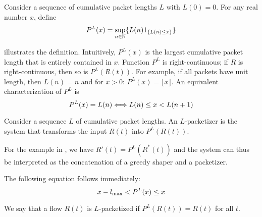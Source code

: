 \begin{definition}
Consider a sequence of cumulative packet lengths $L$ with
$L(0)=0$. For any real number $x$, define
\begin{equation}\mylabel{eq-vlp21}
P^L(x)= \sup_{n \in \Nats} \{ L(n) 1_{\{L(n) \leq  x\}}
 \}
\end{equation}%
 
\end{definition}
\begin{figure}[htbp]
\end{figure}
 illustrates the definition. Intuitively, $P^L(x)$ is
the largest cumulative packet length that is entirely contained in
$x$. Function $P^L$ is right-continuous; if $R$ is
right-continuous, then so is $P^L(R(t))$. For example, if all
packets have unit length, then $L(n)=n$ and for $x>0$:
$P^L(x)=\lfloor x \rfloor$. An equivalent characterization of
$P^L$ is
\begin{equation}\mylabel{eq-pl1}
  P^L(x) = L(n) \Longleftrightarrow L(n) \leq x < L(n+1)
\end{equation}

\begin{definition}
Consider a sequence $L$ of cumulative packet lengths. An
$L$-packetizer is the system that
transforms the input $R(t)$ into $P^L(R(t))$.%
\end{definition}

For the example in , we have $R'(t)=P^L(R^*(t))$
and the system can thus be interpreted as the concatenation of a
greedy shaper and a packetizer.

The following equation follows immediately:
\begin{equation}\mylabel{eq-plmax}
   x - l_{\max} < P^L(x) \leq x
\end{equation}
\begin{definition}
We say that a flow $R(t)$ is $L$-packetized if $P^L(R(t))=R(t)$
for all $t$.
\end{definition}

